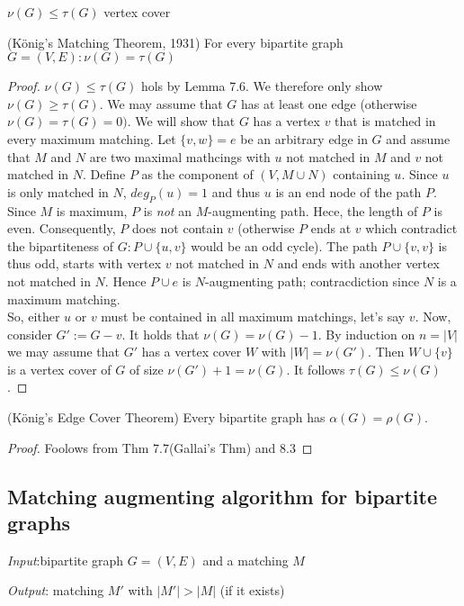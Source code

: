 $\nu(G) \leq \tau(G)$ vertex cover 
\begin{thm}(König's Matching Theorem, 1931)
For every bipartite graph $G=(V,E): \nu(G)=\tau(G)$ 
\end{thm}
\begin{proof} $\nu(G) \leq \tau(G)$ hols by Lemma 7.6. %
We therefore only show $\nu(G) \geq \tau(G)$.
We may assume that $G$ has at least one edge (otherwise $\nu(G)=\tau(G)=0).$ We will show that $G$ has a vertex $v$ that is matched in every maximum matching. Let $\{v,w\}=e$ be an arbitrary edge in $G$ and assume that $M$ and $N$ are two maximal mathcings with $u$ not matched in $M$ and $v$ not matched in $N$. Define $P$ as the component of $(V,M \cup N)$ containing $u$.
Since $u$ is only matched in $N$, $deg_P(u)=1$ and thus $u$ is an end node of the path $P$. Since $M$ is maximum, $P$ is \emph{not} an $M$-augmenting path. Hece, the length of $P$ is even. Consequently, $P$ does not contain $v$ (otherwise $P$ ends at $v$ which contradict the bipartiteness of $G:P\cup \{u,v\}$ would be an odd cycle).
The path $P \cup \{v,v\}$ is thus odd, starts with vertex $v$ not matched in $N$ and ends with another vertex not matched in $N$. Hence $P \cup e$ is $N$-augmenting path; contracdiction since $N$ is a maximum matching.\\
So, either $u$ or $v$ must be contained in all maximum matchings, let's say $v$. Now, consider $G':=G-v$. It holds that $\nu(G)=\nu(G)-1$. By induction on $n=|V|$ we may assume that $G'$ has a vertex cover $W$ with $|W|=\nu(G')$. Then $W \cup \{v\}$ is a vertex cover of $G$ of size $\nu(G')+1=\nu(G)$. It follows $\tau(G)\leq \nu(G)$.
\end{proof}

\begin{cor}(König's Edge Cover Theorem)
Every bipartite graph has $\alpha(G)=\rho(G)$.
\end{cor}
\begin{proof}
Foolows from Thm 7.7(Gallai's Thm) and 8.3 %
\end{proof}

\subsection*{Matching augmenting algorithm for bipartite graphs}

\emph{Input}:bipartite graph $G=(V,E)$ and a matching $M$

\emph{Output}: matching $M'$ with $|M'| > |M|$ (if it exists)

